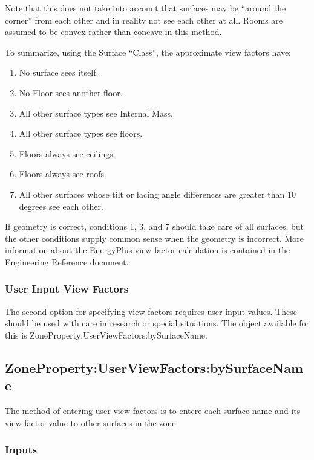 Note that this does not take into account that surfaces may be ``around the corner'' from each other and in reality not see each other at all. Rooms are assumed to be convex rather than concave in this method.

To summarize, using the Surface ``Class'', the approximate view factors have:

\begin{enumerate}
  \item
    No surface sees itself.
  \item
    No Floor sees another floor.
  \item
    All other surface types see Internal Mass.
  \item
    All other surface types see floors.
  \item
    Floors always see ceilings.
  \item
    Floors always see roofs.
  \item
    All other surfaces whose tilt or facing angle differences are greater than 10 degrees see each other.
\end{enumerate}

If geometry is correct, conditions 1, 3, and 7 should take care of all surfaces, but the other conditions supply common sense when the geometry is incorrect. More information about the EnergyPlus view factor calculation is contained in the Engineering Reference document.

\subsubsection{User Input View Factors}\label{user-input-view-factors}

The second option for specifying view factors requires user input values. These should be used with care in research or special situations. The object available for this is ZoneProperty:UserViewFactors:bySurfaceName.

\subsection{ZoneProperty:UserViewFactors:bySurfaceName}\label{zonepropertyuserviewfactorsbysurfacename}

The method of entering user view factors is to entere each surface name and its view factor value to other surfaces in the zone

\subsubsection{Inputs}\label{inputs-17}

